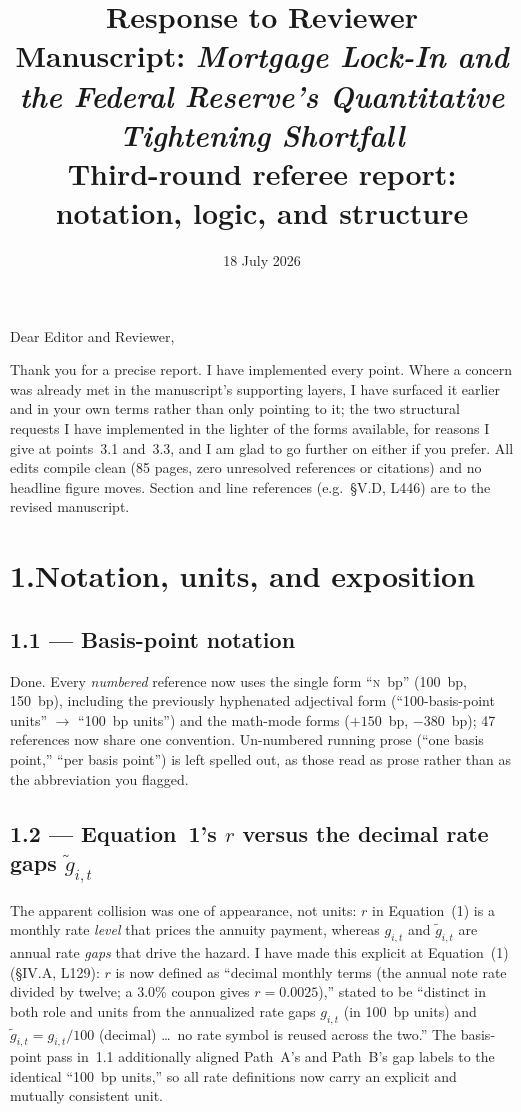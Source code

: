 \documentclass[11pt]{article}
\title{\vspace{-2em}Response to Reviewer\\[0.3em]
\large Manuscript: \emph{Mortgage Lock-In and the Federal Reserve's
Quantitative Tightening Shortfall}\\[0.2em]
\normalsize Third-round referee report: notation, logic, and structure}
\author{}
\date{18 July 2026}
\begin{document}
\sloppy
\maketitle
\vspace{-2.5em}

Dear Editor and Reviewer,

Thank you for a precise report. I have implemented every point. Where a
concern was already met in the manuscript's supporting layers, I have surfaced
it earlier and in your own terms rather than only pointing to it; the two
structural requests I have implemented in the lighter of the forms available,
for reasons I give at points~3.1 and~3.3, and I am glad to go further on either
if you prefer. All edits compile clean (85 pages, zero unresolved references or
citations) and no headline figure moves. Section and line references (e.g.\
\S V.D, L446) are to the revised manuscript.

\section*{1.\quad Notation, units, and exposition}

\subsection*{1.1 --- Basis-point notation}

Done. Every \emph{numbered} reference now uses the single form
``\textsc{n}~bp'' (100~bp, 150~bp), including the previously hyphenated
adjectival form (``100-basis-point units'' $\rightarrow$ ``100~bp units'') and
the math-mode forms ($+150$~bp, $-380$~bp); 47 references now share one
convention. Un-numbered running prose (``one basis point,'' ``per basis
point'') is left spelled out, as those read as prose rather than as the
abbreviation you flagged.

\subsection*{1.2 --- Equation~1's $r$ versus the decimal rate gaps $\tilde g_{i,t}$}

The apparent collision was one of appearance, not units: $r$ in
Equation~(1) is a monthly rate \emph{level} that prices the annuity payment,
whereas $g_{i,t}$ and $\tilde g_{i,t}$ are annual rate \emph{gaps} that drive
the hazard. I have made this explicit at Equation~(1) (\S IV.A, L129): $r$ is
now defined as ``decimal monthly terms (the annual note rate divided by twelve;
a 3.0\% coupon gives $r = 0.0025$),'' stated to be ``distinct in both role and
units from the annualized rate gaps $g_{i,t}$ (in 100~bp units) and
$\tilde g_{i,t} = g_{i,t}/100$ (decimal) \ldots\ no rate symbol is reused
across the two.'' The basis-point pass in~1.1 additionally aligned Path~A's and
Path~B's gap labels to the identical ``100~bp units,'' so all rate definitions
now carry an explicit and mutually consistent unit.
\end{document}
